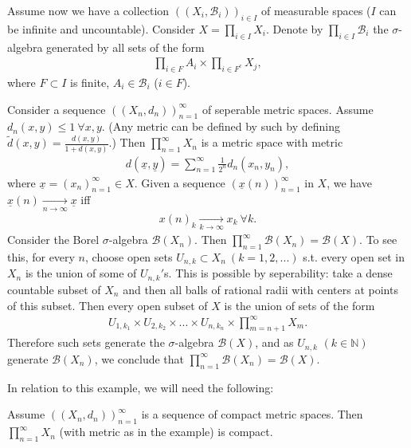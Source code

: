 Assume now we have a collection \(((X_i,\mathscr{B}_i))_{i\in I}\) of measurable spaces (\(I\) can be infinite and uncountable). Consider \(X=\prod_{i\in I} X_i\). Denote by \(\prod_{i\in I}\mathscr{B}_i\) the \(\sigma\)-algebra generated by all sets of the form
\begin{align*}
    \prod\limits_{i\in F}A_i \times \prod\limits_{i\in F^c} X_j,
\end{align*}
where \(F\subset I\) is finite, \(A_i\in\mathscr{B}_i\) (\(i\in F\)).
\begin{example}
    Consider a sequence \(((X_n, d_n))_{n=1}^{\infty}\) of seperable metric spaces. Assume \(d_n(x,y)\leq 1\ \forall x,y\). (Any metric can be defined by such by defining \(\tilde{d}(x,y)=\frac{d(x,y)}{1 + d(x,y)}\).) Then \(\prod_{n=1}^{\infty}X_n\) is a metric space with metric
    \begin{align*}
        d(\underline{x}, \underline{y}) = \sum\limits_{n=1}^{\infty}\frac{1}{2^n}d_n(x_n,y_n),
    \end{align*}
    where \(\underline{x}=(x_n)_{n=1}^{\infty}\in X\). Given a sequence \((\underline{x}(n))_{n=1}^{\infty}\) in \(X\), we have \(\underline{x}(n)\xrightarrow[n\rightarrow\infty]{ }\underline{x}\) iff 
    \begin{align*}
        x(n)_k \xrightarrow[k\rightarrow\infty]{ } x_k \ \forall k.
    \end{align*}
    Consider the Borel \(\sigma\)-algebra \(\mathscr{B}(X_n)\). Then \(\prod_{n=1}^{\infty}\mathscr{B}(X_n)=\mathscr{B}(X)\). To see this, for every \(n\), choose open sets \(U_{n,k}\subset X_n\ (k=1,2,...)\) s.t. every open set in \(X_n\) is the union of some of \(U_{n,k}'\)s. This is possible by seperability: take a dense countable subset of \(X_n\) and then all balls of rational radii with centers at points of this subset. Then every open subset of \(X\) is the union of sets of the form
    \begin{align*}
        U_{1,k_1} \times U_{2,k_2}\times ...\times U_{n,k_n} \times \prod\limits_{m=n+1}^{\infty} X_m.
    \end{align*}
    Therefore such sets generate the \(\sigma\)-algebra \(\mathscr{B}(X)\), and as \(U_{n,k}\) \((k\in\mathbb{N})\) generate \(\mathscr{B}(X_n)\), we conclude that \(\prod_{n=1}^{\infty}\mathscr{B}(X_n)=\mathscr{B}(X)\).
\end{example}
In relation to this example, we will need the following:
\begin{theorem}
    Assume \(((X_n, d_n))_{n=1}^{\infty}\) is a sequence of compact metric spaces. Then \(\prod_{n=1}^{\infty}X_n\) (with metric as in the example) is compact.
\end{theorem}
